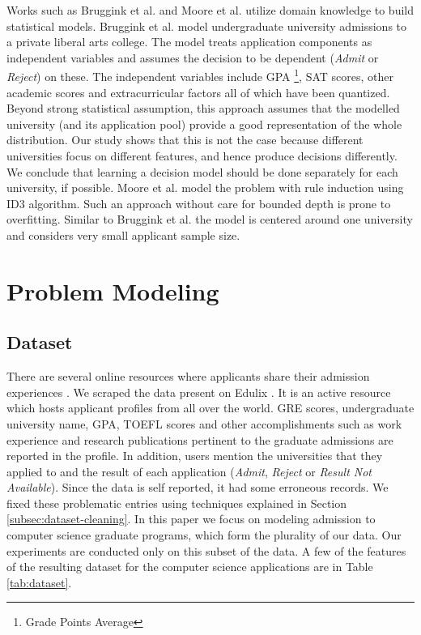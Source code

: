 \documentclass{sig-alternate-05-2015}
\begin{document}
Works such as Bruggink et al. and Moore et al. utilize domain knowledge to build statistical models\cite{bruggink, moore}. Bruggink et al. model undergraduate university admissions to a private liberal arts college. The model treats application components as independent variables and assumes the decision to be dependent (\textit{Admit} or \textit{Reject}) on these. The independent variables include GPA \footnote{Grade Points Average}, SAT scores, other academic scores and extracurricular factors all of which have been quantized. Beyond strong statistical assumption, this approach assumes that the modelled university (and its application pool) provide a good representation of the whole distribution. Our study shows that this is not the case because different universities focus on different features, and hence produce decisions differently. We conclude that learning a decision model should be done separately for each university, if possible. Moore et al. model the problem with rule induction using ID3 algorithm. Such an approach without care for bounded depth is prone to overfitting. Similar to Bruggink et al. the model is centered around one university and considers very small applicant sample size.


\section{Problem Modeling}
\label{sec:problem-modeling}

\subsection{Dataset}
\label{subsec:dataset}
There are several online resources where applicants share their admission experiences \cite{edulix, gradcafe}. We scraped the data present on Edulix \cite{edulix}. It is an active resource which hosts applicant profiles from all over the world. GRE scores, undergraduate university name, GPA, TOEFL scores and other accomplishments such as work experience and research publications pertinent to the graduate admissions are reported in the profile. In addition, users mention the universities that they applied to and the result of each application (\textit{Admit}, \textit{Reject} or \textit{Result Not Available}). Since the data is self reported, it had some erroneous records. We fixed these problematic entries using techniques explained in Section \ref{subsec:dataset-cleaning}. In this paper we focus on modeling admission to computer science graduate programs, which form the plurality of our data. Our experiments are conducted only on this subset of the data. A few of the features of the resulting dataset for the computer science applications are in Table \ref{tab:dataset}.
\end{document}
